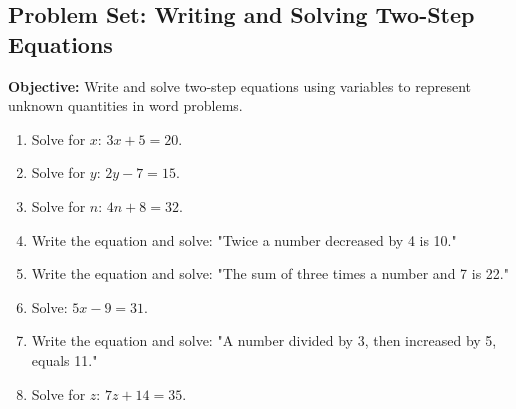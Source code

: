 \documentclass[12pt]{article}
\title{}
\date{}
\begin{document}
\subsection*{Problem Set: Writing and Solving Two-Step Equations}
\onehalfspacing

\begin{tcolorbox}[colframe=black!40, colback=gray!5, 
coltitle=black, colbacktitle=black!20, fonttitle=\bfseries\Large, 
title=Learning Objective, halign title=center, left=5pt, right=5pt, top=5pt, bottom=15pt]
\textbf{Objective:} Write and solve two-step equations using variables to represent unknown quantities in word problems.
\end{tcolorbox}

\begin{tcolorbox}[colframe=black!60, colback=white, 
coltitle=black, colbacktitle=black!15, fonttitle=\bfseries\Large, 
title=Exercises, halign title=center, left=10pt, right=10pt, top=10pt, bottom=60pt]
\begin{enumerate}[itemsep=3em]
    \item Solve for \(x\): \( 3x + 5 = 20 \).
    \item Solve for \(y\): \( 2y - 7 = 15 \).
    \item Solve for \(n\): \( 4n + 8 = 32 \).
    \item Write the equation and solve: "Twice a number decreased by 4 is 10."
    \item Write the equation and solve: "The sum of three times a number and 7 is 22."
    \item Solve: \( 5x - 9 = 31 \).
    \item Write the equation and solve: "A number divided by 3, then increased by 5, equals 11."
    \item Solve for \(z\): \( 7z + 14 = 35 \).
\end{enumerate}
\end{tcolorbox}

\vspace{1em}
\end{document}
